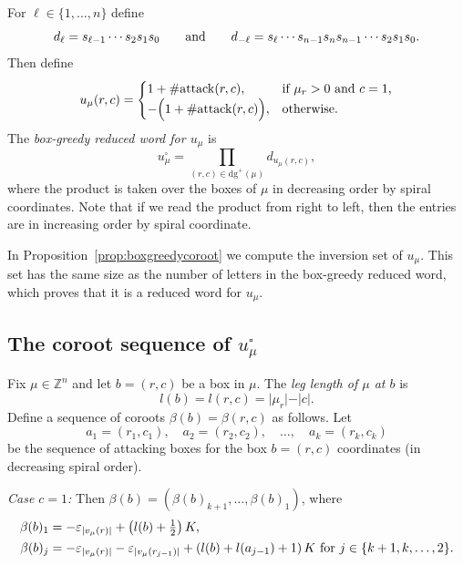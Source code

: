 \documentclass[11pt]{article}
\theoremstyle{plain}
\theoremstyle{definition}
\theoremstyle{remark}
\numberwithin{equation}{section}
\newcommand{\dgplus}{\mathrm{dg}^{+}}
\def\ZZ{\mathbb{Z}}
\newcounter{r}
\newcounter{s}
\begin{document}
For $\ell\in \{1, \ldots, n\}$ define
\begin{equation}
d_\ell = s_{\ell-1}\cdots s_2s_1s_0
\qquad\hbox{and}\qquad
d_{-\ell} = s_\ell\cdots s_{n-1}s_n s_{n-1}\cdots s_2s_1s_0.
\label{didefn}
\end{equation}
Then define
\begin{equation}
u_\mu(r,c) = \begin{cases} 
1+\#\mathrm{attack}(r,c), &\hbox{if $\mu_r>0$ and $c=1$,} \\
-\Big(1+\#\mathrm{attack}(r,c)\Big), &\hbox{otherwise}.
\end{cases}
\label{boxfactor}
\end{equation}
The \emph{box-greedy reduced word for $u_\mu$} is 
\begin{equation}
u_\mu^\square = \prod_{(r,c)\in \dgplus(\mu) } d_{u_\mu(r,c)},
\label{boxgreedyredwd}
\end{equation}
where the product is taken over the boxes of $\mu$ in decreasing order by spiral coordinates. Note that if we read the product from right to left, then the entries are in increasing order by spiral coordinate.

In Proposition~\ref{prop:boxgreedycoroot} we compute the inversion set of $u_{\mu}$.  
This set has the same size as the number of letters in the box-greedy reduced word, which proves that it is a reduced word for $u_{\mu}$. 


\subsection{The coroot sequence of $u_\mu^\square$}
\label{section:coroot}

Fix $\mu\in \ZZ^n$ and let $b=(r,c)$ be a box in $\mu$. The \emph{leg length of $\mu$ at $b$} is 
\begin{equation}
l(b) = l(r,c) = \vert \mu_r\vert -\vert c\vert.
\label{legdefn}
\end{equation}
Define a sequence of coroots $\beta(b) = \beta(r,c)$ as follows.
Let
$$
a_1 = (r_{1}, c_{1}), \quad
a_2 = (r_{2}, c_{2}), \quad\ldots,\quad
a_k = (r_{k}, c_{k})
$$
be the sequence of attacking boxes for the box $b=(r,c)$ coordinates (in decreasing spiral order).

\smallskip\noindent
\emph{Case $c=1$:} Then $\beta(b) = (\beta(b)_{k+1}, \ldots, \beta(b)_1)$, where
\begin{align}
\beta(b)_1 &= -\varepsilon_{|v_\mu(r)|} + \left(l(b) + \textstyle\frac{1}{2}\right) K ,  \nonumber \\
\beta(b)_j &= -\varepsilon_{|v_\mu(r)|} - \varepsilon_{|v_\mu(r_{j-1})|} + \left(l(b) + l(a_{j-1})+1\right)K \ \hbox{for $j \in \{k+1, k, \ldots, 2\}$}.
\label{rtseqa}
\end{align}
\end{document}
